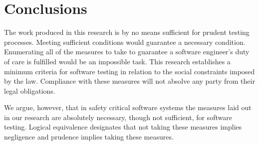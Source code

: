 \chapter{Conclusions}

The work produced in this research is by no means sufficient for prudent testing
processes. Meeting sufficient conditions would guarantee a necessary condition.
Enumerating all of the measures to take to guarantee a software engineer's duty
of care is fulfilled would be an impossible task. This research establishes a
minimum criteria for software testing in relation to the social constraints
imposed by the law. Compliance with these measures will not absolve any party
from their legal obligations.

We argue, however, that in safety critical software systems the measures laid
out in our research are absolutely necessary, though not sufficient, for
software testing. Logical equivalence designates that not taking these
measures implies negligence and prudence implies taking these measures.
